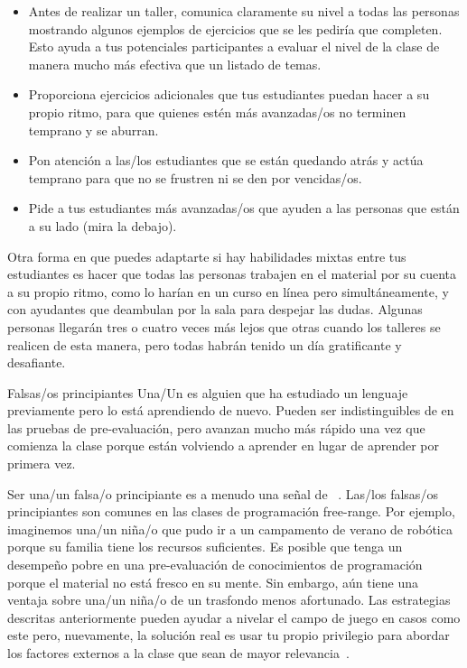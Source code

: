 \begin{itemize}

\item
  Antes de realizar un taller,
  comunica claramente su nivel a todas las personas mostrando algunos ejemplos de ejercicios que se les pediría que completen.
  Esto ayuda a tus potenciales participantes a evaluar el nivel de la clase
  de manera mucho más efectiva que un listado de temas.
  
\item
  Proporciona ejercicios adicionales que tus estudiantes puedan hacer a su propio ritmo,
  para que quienes estén más avanzadas/os no terminen temprano y se aburran.

\item
  Pon atención a las/los estudiantes que se están quedando atrás
  y actúa temprano para que no se frustren ni se den por vencidas/os.

\item
  Pide a tus estudiantes más avanzadas/os que ayuden a las personas que están a su lado
  (mira la  debajo).

\end{itemize}

Otra forma en que puedes adaptarte si hay habilidades mixtas entre tus estudiantes es
hacer que todas las personas trabajen en el material por su cuenta a su propio ritmo,
como lo harían en un curso en línea pero simultáneamente,
y con ayudantes que deambulan por la sala para despejar las dudas.
Algunas personas llegarán tres o cuatro veces más lejos que otras cuando los talleres se realicen de esta manera,
pero todas habrán tenido un día gratificante y desafiante.

\begin{aside}{Falsas/os principiantes}
  Una/Un  es alguien
  que ha estudiado un lenguaje previamente pero lo está aprendiendo de nuevo.
  Pueden ser indistinguibles de 
  en las pruebas de pre-evaluación,
  pero avanzan mucho más rápido una vez que comienza la clase
  porque están volviendo a aprender en lugar de aprender por primera vez.
 
  Ser una/un falsa/o principiante es a menudo una señal de ~\cite{Marg2010}.
  Las/los falsas/os principiantes son comunes en las clases de programación free-range.
  Por ejemplo, imaginemos
  una/un niña/o que pudo ir a un campamento de verano de robótica porque su familia tiene los recursos suficientes. Es posible que tenga
  un desempeño pobre en una pre-evaluación de conocimientos de programación
  porque el material no está fresco en su mente. Sin embargo,
  aún tiene una ventaja sobre una/un niña/o de un trasfondo menos afortunado.
  Las estrategias descritas anteriormente pueden ayudar a nivelar el campo de juego en casos como este
  pero, nuevamente, la solución real es usar tu propio privilegio
  para abordar los factores externos a la clase que sean de mayor relevancia~\cite{Part2011}.
\end{aside}

